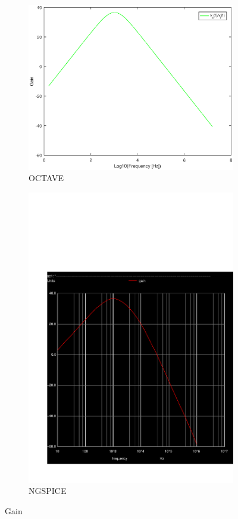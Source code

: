 \begin{figure}[H] 
\centering
\begin{subfigure}{0.3\textwidth}
\includegraphics[width=\textwidth]{gain.eps}
\caption{OCTAVE}
\label{Octave_gain}
\end{subfigure}
\begin{subfigure}{0.3\textwidth}
\includegraphics[width=\textwidth]{Gain.pdf}
\caption{NGSPICE}
\label{Ngspice_gain}
\end{subfigure}
\caption{Gain}
\end{figure}

